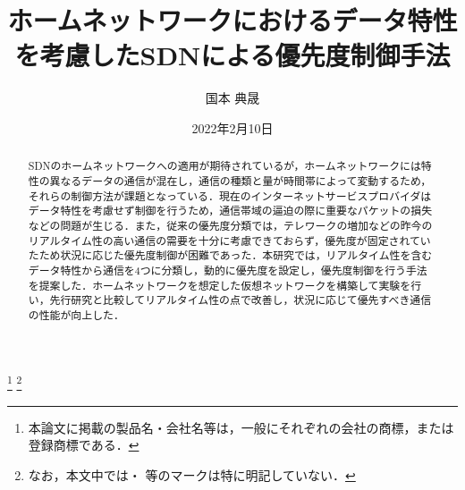 \documentclass[a4paper,11pt,uplatex]{ujreport}
\title{ホームネットワークにおけるデータ特性を考慮したSDNによる優先度制御手法}  %
\author{国本 典晟}  %
\date{2022年2月10日}  %
\begin{document}
\maketitle
\clearpage

\begin{abstract}
  SDNのホームネットワークへの適用が期待されているが，ホームネットワークには特性の異なるデータの通信が混在し，通信の種類と量が時間帯によって変動するため，それらの制御方法が課題となっている．現在のインターネットサービスプロバイダはデータ特性を考慮せず制御を行うため，通信帯域の逼迫の際に重要なパケットの損失などの問題が生じる．また，従来の優先度分類では，テレワークの増加などの昨今のリアルタイム性の高い通信の需要を十分に考慮できておらず，優先度が固定されていたため状況に応じた優先度制御が困難であった．本研究では，リアルタイム性を含むデータ特性から通信を4つに分類し，動的に優先度を設定し，優先度制御を行う手法を提案した．ホームネットワークを想定した仮想ネットワークを構築して実験を行い，先行研究と比較してリアルタイム性の点で改善し，状況に応じて優先すべき通信の性能が向上した．

\end{abstract}


\footnote[0]{本論文に掲載の製品名・会社名等は，一般にそれぞれの会社の商標，または登録商標である．}
\footnote[0]{なお，本文中では\texttrademark ・ \textregistered 等のマークは特に明記していない．}

\end{document}
